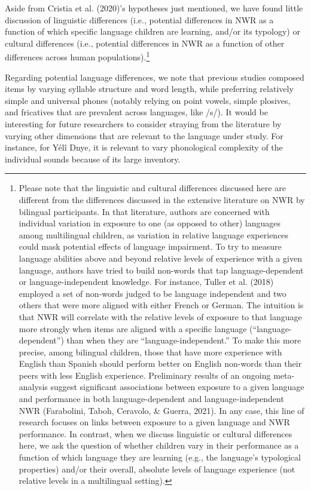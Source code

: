 \documentclass[
  american,
  ,man,floatsintext]{apa6}
\begin{document}
Aside from Cristia et al. (2020)'s hypotheses just mentioned, we have found little discussion of linguistic differences (i.e., potential differences in NWR as a function of which specific language children are learning, and/or its typology) or cultural differences (i.e., potential differences in NWR as a function of other differences across human populations).\footnote{Please note that the linguistic and cultural differences discussed here are different from the differences discussed in the extensive literature on NWR by bilingual participants. In that literature, authors are concerned with individual variation in exposure to one (as opposed to other) languages among multilingual children, as variation in relative language experiences could mask potential effects of language impairment. To try to measure language abilities above and beyond relative levels of experience with a given language, authors have tried to build non-words that tap language-dependent or language-independent knowledge. For instance, Tuller et al. (2018) employed a set of non-words judged to be language independent and two others that were more aligned with either French or German. The intuition is that NWR will correlate with the relative levels of exposure to that language more strongly when items are aligned with a specific language (``language-dependent'') than when they are ``language-independent.'' To make this more precise, among bilingual children, those that have more experience with English than Spanish should perform better on English non-words than their peers with less English experience. Preliminary results of an ongoing meta-analysis suggest significant associations between exposure to a given language and performance in both language-dependent and language-independent NWR (Farabolini, Taboh, Ceravolo, \& Guerra, 2021). In any case, this line of research focuses on links between exposure to a given language and NWR performance. In contrast, when we discuss linguistic or cultural differences here, we ask the question of whether children vary in their performance as a function of which language they are learning (e.g., the language's typological properties) and/or their overall, absolute levels of language experience (not relative levels in a multilingual setting).}

Regarding potential language differences, we note that previous studies composed items by varying syllable structure and word length, while preferring relatively simple and universal phones (notably relying on point vowels, simple plosives, and fricatives that are prevalent across languages, like /s/). It would be interesting for future researchers to consider straying from the literature by varying other dimensions that are relevant to the language under study. For instance, for Yélî Dnye, it is relevant to vary phonological complexity of the individual sounds because of its large inventory.
\end{document}
